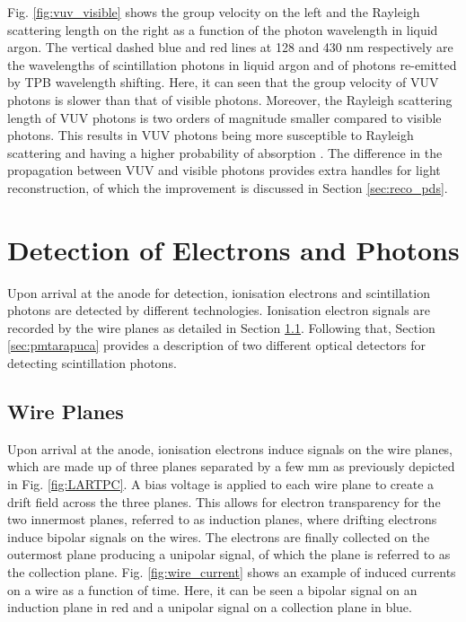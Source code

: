 Fig. \ref{fig:vuv_visible} shows the group velocity on the left and the Rayleigh scattering length on the right as a function of the photon wavelength in liquid argon.
The vertical dashed blue and red lines at 128 and 430 nm respectively are the wavelengths of scintillation photons in liquid argon and of photons re-emitted by TPB wavelength shifting. 
Here, it can seen that the group velocity of VUV photons is slower than that of visible photons.
Moreover, the Rayleigh scattering length of VUV photons is two orders of magnitude smaller compared to visible photons.
This results in VUV photons being more susceptible to Rayleigh scattering and having a higher probability of absorption \cite{PatrickPhD}.
The difference in the propagation between VUV and visible photons provides extra handles for light reconstruction, of which the improvement is discussed in Section \ref{sec:reco_pds}.

\section{Detection of Electrons and Photons}

\label{sec3:detection}

Upon arrival at the anode for detection, ionisation electrons and scintillation photons are detected by different technologies.
Ionisation electron signals are recorded by the wire planes as detailed in Section \ref{sec:wire}.
Following that, Section \ref{sec:pmtarapuca} provides a description of two different optical detectors for detecting scintillation photons.

\subsection{Wire Planes}
\label{sec:wire}

Upon arrival at the anode, ionisation electrons induce signals on the wire planes, which are made up of three planes separated by a few mm as previously depicted in Fig. \ref{fig:LARTPC}.
A bias voltage is applied to each wire plane to create a drift field across the three planes.
This allows for electron transparency for the two innermost planes, referred to as induction planes, where drifting electrons induce bipolar signals on the wires.
The electrons are finally collected on the outermost plane producing a unipolar signal, of which the plane is referred to as the collection plane.
Fig. \ref{fig:wire_current} shows an example of induced currents on a wire as a function of time.
Here, it can be seen a bipolar signal on an induction plane in red and a unipolar signal on a collection plane in blue.

